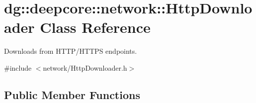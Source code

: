 \hypertarget{classdg_1_1deepcore_1_1network_1_1_http_downloader}{}\section{dg\+:\+:deepcore\+:\+:network\+:\+:Http\+Downloader Class Reference}
\label{classdg_1_1deepcore_1_1network_1_1_http_downloader}


Downloads from H\+T\+T\+P/\+H\+T\+T\+PS endpoints.  




{\ttfamily \#include $<$network/\+Http\+Downloader.\+h$>$}

\subsection*{Public Member Functions}
